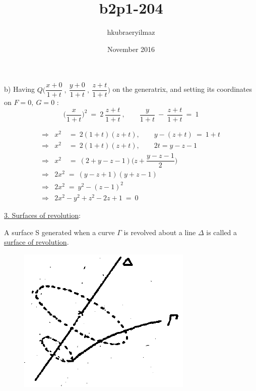 \documentclass[11pt]{article}
\title{b2p1-204}
\author{hkubraeryilmaz }
\date{November 2016}
\begin{document}

b) Having \(Q\bigg(\dfrac{x+0}{1+t}\ , \ \dfrac{y+0}{1+t} \ , \ \dfrac{z+t}{1+t}\bigg) \) on the generatrix, and setting its coordinates on $F=0, \ G=0$ :
\[
    \bigg(\dfrac{x}{1+t}\bigg)^2 \ = \ 2 \ \dfrac{z+t}{1+t} \ , \qquad \frac{y}{1+t} \ - \ \frac{z+t}{1+t} \ = \ 1 
\]

\begin{align*}
    \Rightarrow &x^2 \quad = \ 2(1+t)(z+t), \qquad y-(z+t) \ = \ 1+t \\
    \Rightarrow &x^2 \quad = \ 2(1+t)(z+t), \qquad 2t=y-z-1 \\
    \Rightarrow &x^2 \quad = \ (2+y-z-1)\bigg(z+ \dfrac{y-z-1}{2} \bigg) \\
    \Rightarrow &2x^2 \; = \ (y-z+1)(y+z-1) \\
    \Rightarrow &2x^2 \; = \ y^2 - (z-1)^2 \\
    \Rightarrow &2x^2-y^2+z^2-2z+1 \ = \ 0 
\end{align*}

\underline{3. Surfaces of revolution}: 

A surface S generated when a curve $\Gamma$ is revolved about a line $\Delta$ is called a \underline{surface of revolution}. 

\begin{figure}
    \includegraphics[width=\linewidth]{images/b2p1-204-fig01.png}
    \caption*{}
\end{figure}
\end{document}

